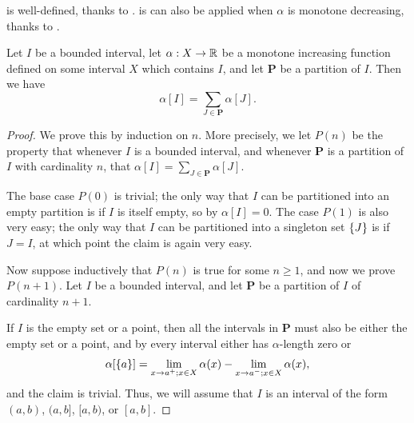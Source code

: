 \begin{note}
   is well-defined, thanks to .
   is can also be applied when \(\alpha\) is monotone decreasing, thanks to .
\end{note}

\setcounter{thm}{3}
\begin{lem}\label{i:11.8.4}
  Let \(I\) be a bounded interval, let \(\alpha : X \to \mathbb{R}\) be a monotone increasing function defined on some interval \(X\) which contains \(I\), and let \(\mathbf{P}\) be a partition of \(I\).
  Then we have
  \[
    \alpha[I] = \sum_{J \in \mathbf{P}} \alpha[J].
  \]
\end{lem}

\begin{proof}
  We prove this by induction on \(n\).
  More precisely, we let \(P(n)\) be the property that whenever \(I\) is a bounded interval, and whenever \(\mathbf{P}\) is a partition of \(I\) with cardinality \(n\), that \(\alpha[I] = \sum_{J \in \mathbf{P}} \alpha[J]\).

  The base case \(P(0)\) is trivial;
  the only way that \(I\) can be partitioned into an empty partition is if \(I\) is itself empty, so by  \(\alpha[I] = 0\).
  The case \(P(1)\) is also very easy;
  the only way that \(I\) can be partitioned into a singleton set \(\left\lbrace J\right\rbrace\) is if \(J = I\), at which point the claim is again very easy.

  Now suppose inductively that \(P(n)\) is true for some \(n \geq 1\), and now we prove \(P(n + 1)\).
  Let \(I\) be a bounded interval, and let \(\mathbf{P}\) be a partition of \(I\) of cardinality \(n + 1\).

  If \(I\) is the empty set or a point, then all the intervals in \(\mathbf{P}\) must also be either the empty set or a point, and by  every interval either has \(\alpha\)-length zero or
  \[
    \alpha[\left\lbrace a\right\rbrace] = \lim_{x \to a^+ ; x \in X} \alpha(x) - \lim_{x \to a^- ; x \in X} \alpha(x),
  \]
  and the claim is trivial.
  Thus, we will assume that \(I\) is an interval of the form \((a, b)\), \((a, b]\), \([a, b)\), or \([a, b]\).


\end{proof}
